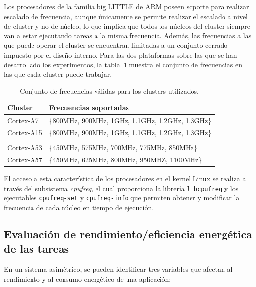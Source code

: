 Los procesadores de la familia big.LITTLE de ARM poseen soporte para
realizar escalado de frecuencia, aunque únicamente se permite realizar el
escalado a nivel de cluster y no de núcleo, lo que implica que todos los
núcleos del cluster siempre van a estar ejecutando tareas a la misma
frecuencia. Además, las frecuencias a las que puede operar el cluster se
encuentran limitadas a un conjunto cerrado impuesto por el diseño
interno. Para las dos plataformas sobre las que se han desarrollado los
experimentos, la tabla~\ref{tab:cjto-freqs} muestra el conjunto de
frecuencias en las que cada cluster puede trabajar.

\begin{table}
  \centering
  {
    \ca{8pt}
    \begin{tabular}{ll}
      Cluster & Frecuencias soportadas \\\hline
      Cortex-A7    & \{800MHz, 900MHz, 1GHz, 1.1GHz, 1.2GHz, 1.3GHz\}\\
      Cortex-A15& \{800MHz, 900MHz, 1GHz, 1.1GHz, 1.2GHz,
                  1.3GHz\}\\\\
      Cortex-A53& \{450MHz, 575MHz, 700MHz, 775MHz,
                  850MHz\}\\
      Cortex-A57& \{450MHz, 625MHz, 800MHz, 950MHZ, 1100MHz\}\\\bottomrule
    \end{tabular}
  }
    \caption{Conjunto de frecuencias válidas para los clusters utilizados.}
    \label{tab:cjto-freqs}
\end{table}

El acceso a esta característica de los procesadores en el kernel Linux se
realiza a través del subsistema \emph{cpufreq}, el cual proporciona la
librería \texttt{libcpufreq} y los ejecutables \texttt{cpufreq-set} y
\texttt{cpufreq-info} que permiten obtener y modificar la frecuencia de
cada núcleo en tiempo de ejecución.

\subsection{Evaluación de rendimiento/eficiencia energética de las tareas}

En un sistema asimétrico, se pueden identificar tres variables que afectan
al rendimiento y al consumo energético de una aplicación: 

